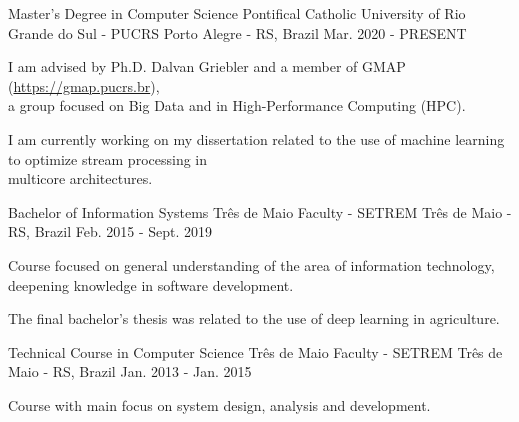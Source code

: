 
\begin{cventries}
	\cventry
	{Master's Degree in Computer Science} %
	{Pontifical Catholic University of Rio Grande do Sul - PUCRS} %
	{Porto Alegre - RS, Brazil} %
	{Mar. 2020 - PRESENT} %
	{
		\begin{cvitems} %
			\item {I am advised by Ph.D. Dalvan Griebler and a member of GMAP (\href{https://gmap.pucrs.br}{https://gmap.pucrs.br}),\\a group focused on Big Data and in High-Performance Computing (HPC).}
			\item {I am currently working on my dissertation related to the use of machine learning to optimize stream processing in\\multicore architectures.}
		\end{cvitems}
	}

	\cventry
	{Bachelor of Information Systems} %
	{Três de Maio Faculty - SETREM} %
	{Três de Maio - RS, Brazil} %
	{Feb. 2015 - Sept. 2019} %
	{
		\begin{cvitems} %
			\item {Course focused on general understanding of the area of information technology,\\deepening knowledge in software development.}
			\item {The final bachelor's thesis was related to the use of deep learning in agriculture.}
		\end{cvitems}
	}

	\cventry
	{Technical Course in Computer Science} %
	{Três de Maio Faculty - SETREM} %
	{Três de Maio - RS, Brazil} %
	{Jan. 2013 - Jan. 2015} %
	{
		\begin{cvitems} %
			\item {Course with main focus on system design, analysis and development.}
		\end{cvitems}
	}
\end{cventries}
